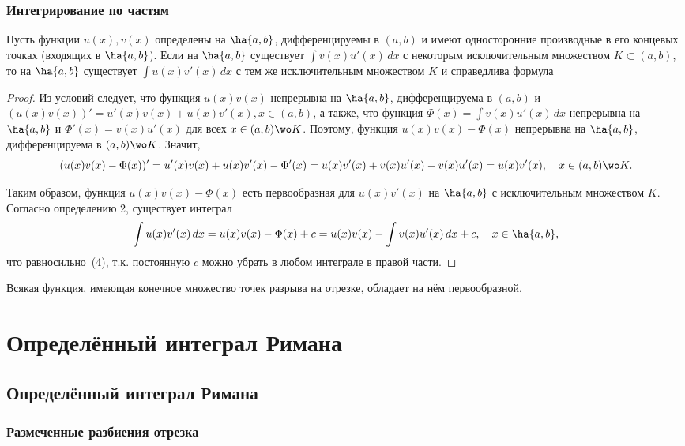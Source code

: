 \documentclass[a4paper]{article}
\begin{document}
\subsubsection{Интегрирование по частям}
\begin{theorem}
  Пусть функции $u(x), v(x)$ определены на $\ha{a,b}$,
  дифференцируемы в $(a,b)$ и имеют односторонние производные в его
  концевых точках (входящих в $\ha{a,b}$). Если на $\ha{a,b}$
  существует $\int v(x)u'(x) \,dx$ с некоторым исключительным
  множеством $K \subset (a,b)$, то на $\ha{a,b}$ существует $\int
  u(x)v'(x) \,dx$ с тем же исключительным множеством $K$ и
  справедлива формула 
\end{theorem}
\begin{proof}
Из условий следует, что функция $u(x)v(x)$ непрерывна на $\ha{a,b}$, дифференцируема в $(a,b)$ и $(u(x)v(x))'=u'(x)v(x)+u(x)v'(x),
x\in(a,b)$, а также, что функция $\Phi(x)=\int v(x)u'(x) \,dx$
непрерывна на $\ha{a,b}$ и $\Phi'(x)=v(x)u'(x)$ для всех
$x\in(a,b)\wo K$. Поэтому, функция $u(x)v(x)-\Phi(x)$
непрерывна на $\ha{a,b}$, дифференцируема в $(a,b)\wo K$.
Значит,
$$(u(x)v(x)-\Phi(x))'=u'(x)v(x)+u(x)v'(x)-\Phi'(x)=u(x)v'(x)+v(x)u'(x)-v(x)u'
(x)=u(x)v'(x), \quad x\in(a,b)\wo K.$$

Таким образом, функция $u(x)v(x)-\Phi(x)$ есть первообразная для
$u(x)v'(x)$ на $\ha{a,b}$ с исключительным множеством $K$. Согласно
определению 2, существует интеграл
$$\int u(x)v'(x) \,dx = u(x)v(x)-\Phi(x)+c=u(x)v(x) - \int v(x)u'(x) \,dx + c, \quad x\in \ha{a,b},$$
что равносильно~(4), т.к. постоянную $c$ можно убрать в любом
интеграле в правой части.
\end{proof}
\begin{note}
Всякая функция, имеющая конечное множество точек разрыва на отрезке,
обладает на нём первообразной.
\end{note}

\section{Определённый интеграл Римана}

\subsection{Определённый интеграл Римана}

\subsubsection{Размеченные разбиения отрезка}
\end{document}
